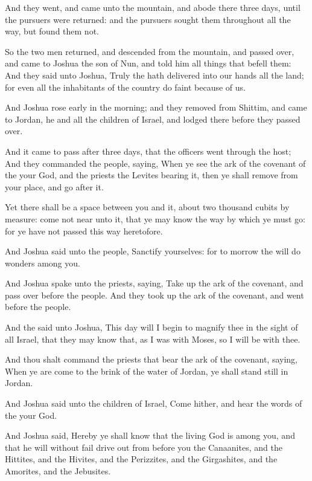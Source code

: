 \Verse And they went, and came unto the mountain, and abode there three days, until the pursuers were returned: and the pursuers sought them throughout all the way, but found them not.

\Verse So the two men returned, and descended from the mountain, and passed over, and came to Joshua the son of Nun, and told him all things that befell them: \Verse And they said unto Joshua, Truly the \LORD hath delivered into our hands all the land; for even all the inhabitants of the country do faint because of us.


\Chapter
\Verse And Joshua rose early in the morning; and they removed from Shittim, and came to Jordan, he and all the children of Israel, and lodged there before they passed over.

\Verse And it came to pass after three days, that the officers went through the host; \Verse And they commanded the people, saying, When ye see the ark of the covenant of the \LORD your God, and the priests the Levites bearing it, then ye shall remove from your place, and go after it.

\Verse Yet there shall be a space between you and it, about two thousand cubits by measure: come not near unto it, that ye may know the way by which ye must go: for ye have not passed this way heretofore.

\Verse And Joshua said unto the people, Sanctify yourselves: for to morrow the \LORD will do wonders among you.

\Verse And Joshua spake unto the priests, saying, Take up the ark of the covenant, and pass over before the people. And they took up the ark of the covenant, and went before the people.

\Verse And the \LORD said unto Joshua, This day will I begin to magnify thee in the sight of all Israel, that they may know that, as I was with Moses, so I will be with thee.

\Verse And thou shalt command the priests that bear the ark of the covenant, saying, When ye are come to the brink of the water of Jordan, ye shall stand still in Jordan.

\Verse And Joshua said unto the children of Israel, Come hither, and hear the words of the \LORD your God.

\Verse And Joshua said, Hereby ye shall know that the living God is among you, and that he will without fail drive out from before you the Canaanites, and the Hittites, and the Hivites, and the Perizzites, and the Girgashites, and the Amorites, and the Jebusites.

